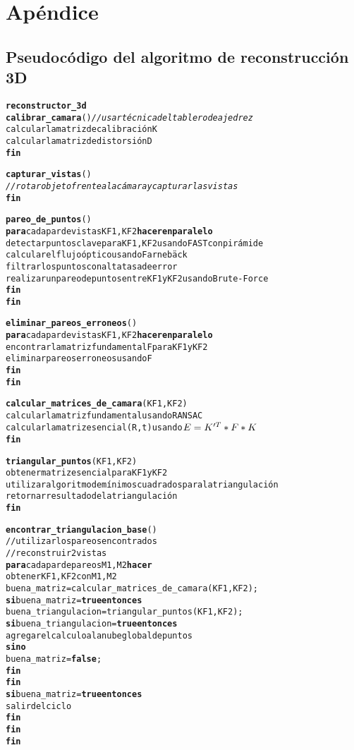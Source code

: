 \chapter{Ap\'{e}ndice}
\label{chap:apendice}

\section{Pseudoc\'{o}digo del algoritmo de reconstrucci\'{o}n 3D}
\begin{alltt}
\textbf{reconstructor_3d}
  \textbf{calibrar_camara}() \textit{// usar t\'{e}cnica del tablero de ajedrez}
    calcular la matriz de calibraci\'{o}n K
    calcular la matriz de distorsi\'{o}n D
  \textbf{fin}
  
  \textbf{capturar_vistas}() 
    \textit{// rotar objeto frente a la c\'{a}mara y capturar las vistas}
  \textbf{fin}
  
  \textbf{pareo_de_puntos}()
    \textbf{para} cada par de vistas KF1, KF2 \textbf{hacer en paralelo}
      detectar puntos clave para KF1, KF2 usando FAST con pir\'{a}mide
      calcular el flujo \'{o}ptico usando Farnebäck
      filtrar los puntos con alta tasa de error
      realizar un pareo de puntos entre KF1 y KF2 usando Brute-Force
    \textbf{fin}
  \textbf{fin}
  
  \textbf{eliminar_pareos_erroneos}()
    \textbf{para} cada par de vistas KF1, KF2 \textbf{hacer en paralelo}
      encontrar la matriz fundamental F para KF1 y KF2
      eliminar pareos erroneos usando F
    \textbf{fin}
  \textbf{fin}
  
  \textbf{calcular_matrices_de_camara}(KF1, KF2)
    calcular la matriz fundamental usando RANSAC
    calcular la matriz esencial (R,t) usando \(E = K'\sp{T}*F*K\)
  \textbf{fin}
  
  \textbf{triangular_puntos}(KF1, KF2)
    obtener matriz esencial para KF1 y KF2
    utilizar algoritmo de m\'{i}nimos cuadrados para la triangulaci\'{o}n
    retornar resultado de la triangulaci\'{o}n
  \textbf{fin}
  
  \textbf{encontrar_triangulacion_base}()
    // utilizar los pareos encontrados
    // reconstruir 2 vistas
    \textbf{para} cada par de pareos M1, M2 \textbf{hacer}
      obtener KF1, KF2 con M1, M2
      buena_matriz = calcular_matrices_de_camara(KF1, KF2);
      \textbf{si} buena_matriz = \textbf{true} \textbf{entonces}
        buena_triangulacion = triangular_puntos(KF1, KF2);
        \textbf{si} buena_triangulacion = \textbf{true} \textbf{entonces}
          agregar el calculo a la nube global de puntos
        \textbf{sino}
          buena_matriz = \textbf{false};
        \textbf{fin}
      \textbf{fin}
      \textbf{si} buena_matriz = \textbf{true} \textbf{entonces}
        salir del ciclo
      \textbf{fin}
    \textbf{fin}
  \textbf{fin}
  

\end{alltt}
